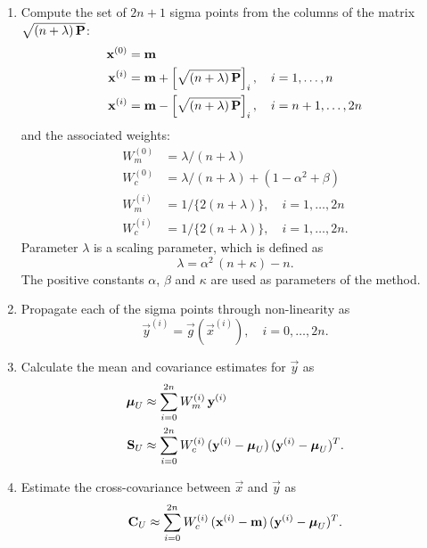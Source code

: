 \begin{enumerate}
\item Compute the set of $2n+1$ sigma points from the columns of the
matrix $\sqrt{(n + \lambda) \, \mathbf{P}}$:
%
  \begin{equation}
  \begin{split} \mathbf{x}^{(0)} &= \mathbf{m} \\ \mathbf{x}^{(i)} &= \mathbf{m} +
\left[\sqrt{(n + \lambda) \, \mathbf{P}}\right]_i, \quad i=1,\ldots,n \\
\mathbf{x}^{(i)} &= \mathbf{m} - \left[\sqrt{(n + \lambda) \,
\mathbf{P}}\right]_i, \quad i=n+1,\ldots,2n
  \end{split}
  \label{eq:ut_sigmas}
  \end{equation}
%
  and the associated weights:
%
  \begin{equation}
  \begin{split} W^{(0)}_m &= \lambda / (n + \lambda) \\ W^{(0)}_c &=
\lambda / (n + \lambda) + (1 - \alpha^2 + \beta) \\ W^{(i)}_m &= 1 /
\{ 2(n + \lambda) \}, \quad i=1,\ldots,2n \\ W^{(i)}_c &= 1 / \{ 2(n +
\lambda) \}, \quad i=1,\ldots,2n.
  \end{split} \label{eq:ut_weights}
  \end{equation}
%
  Parameter $\lambda$ is a scaling parameter, which is defined as
%
  \begin{equation} \lambda = \alpha^2 \, (n + \kappa) - n.
  \end{equation}
  The positive constants $\alpha$, $\beta$ and $\kappa$ are used as
parameters of the method.

\item Propagate each of the sigma points through non-linearity as
%
  \begin{equation} \vec{y}^{(i)} = \vec{g}(\vec{x}^{(i)}), \quad
i=0,\ldots,2n.
  \label{eq:sigma_g}
  \end{equation}

\item Calculate the mean and covariance estimates for $\vec{y}$ as
%
  \begin{align} \boldsymbol{\mu}_U &\approx \sum_{i=0}^{2n} W^{(i)}_m \,
\mathbf{y}^{(i)} \\ \mathbf{S}_U &\approx \sum_{i=0}^{2n} W^{(i)}_c \,
(\mathbf{y}^{(i)} - \boldsymbol{\mu}_U) \, (\mathbf{y}^{(i)} - \boldsymbol{\mu}_U)^T.
  \end{align}
  
\item Estimate the cross-covariance between $\vec{x}$ and $\vec{y}$ as
%
  \begin{equation} \mathbf{C}_U \approx \sum_{i=0}^{2n} W^{(i)}_c \,
(\mathbf{x}^{(i)} - \mathbf{m}) \, (\mathbf{y}^{(i)} - \boldsymbol{\mu}_U)^T.
  \end{equation}
\end{enumerate}
%

